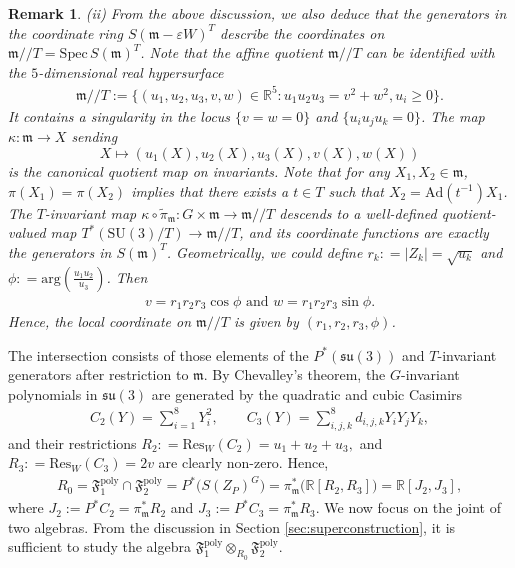 \documentclass[11pt]{amsart}
\theoremstyle{definition}
\theoremstyle{plain}
\newtheorem{remark}[theorem]{Remark}
\theoremstyle{conclusion}
\begin{document}
\begin{remark}
  (ii)   From the above discussion, we also deduce that the generators in the coordinate ring $S(\mathfrak{m}-\varepsilon W)^T$ describe the coordinates on $ \mathfrak{m}//T= \mathrm{Spec}\,S(\mathfrak{m})^T$. Note that the affine quotient $\mathfrak{m}//T$ can be identified with the $5$-dimensional real hypersurface \begin{align}
    \mathfrak{m}//T:= \{(u_1,u_2,u_3,v,w)\in\mathbb{R}^{5}: u_1u_2u_3 = v^2 + w^2,  u_i \geq 0 \}. \label{eq:afb}
\end{align} It contains a singularity in the locus $\{v = w  = 0\}$ and $\{u_iu_ju_k = 0\}$.   The map $\kappa:\mathfrak{m}\to X$ sending $$X\mapsto(u_1(X),u_2(X),u_3(X),v(X),w(X))$$ is the canonical quotient map on invariants. Note that for any $X_1,X_2 \in \mathfrak{m}$, $\pi(X_1) = \pi(X_2)$ implies that there exists a $t \in T$ such that $X_2 = \mathrm{Ad}(t^{-1})X_1$. The $T$-invariant map $\kappa\circ\widetilde{\pi}_{\mathfrak{m}}:G\times\mathfrak{m}\to\mathfrak{m}//T$ descends to a well-defined quotient-valued map $T^*(\mathrm{SU}(3)/T)\to\mathfrak{m}//T$, and its coordinate functions are exactly the generators in $S(\mathfrak{m})^T$. Geometrically, we could define $r_k : = |Z_k| = \sqrt{u_k}$ and $\phi : = \mathrm{arg} \left(\frac{u_1 u_2}{u_3}\right)$. Then \begin{align*}
    v = r_1 r_2 r_3 \cos \phi \text{ and } w   = r_1 r_2 r_3 \sin \phi.
\end{align*} Hence, the local coordinate on $\mathfrak{m}//T$ is given by $(r_1,r_2,r_3,\phi)$.
\end{remark}


 

The intersection consists of those elements of the $P^*(\mathfrak{su}(3))$ and $T$-invariant generators after restriction to $\mathfrak{m}$. By Chevalley’s theorem, the $G$-invariant polynomials in $\mathfrak{su}(3)$ are generated by the quadratic and cubic Casimirs  \begin{align}
    C_2(Y)=\sum_{i=1}^8Y_i^2,\qquad  C_3(Y)=\sum_{i,j,k}^8d_{i,j,k}Y_iY_jY_k, \label{eq:Casimir}
\end{align}   and their restrictions $ R_2 : = \mathrm{Res}_W (C_2)  =u_1+u_2+u_3,$ and $ R_3 : = \mathrm{Res}_W (C_3)=2v $ are clearly non-zero.  Hence, \begin{align*}
R_0 = \mathfrak{F}_1^{\mathrm{poly}}\cap \mathfrak{F}_2^{\mathrm{poly}} =P^* \bigl(S(Z_P)^G\bigr) =\pi_\mathfrak{m}^* \bigl(\mathbb{R}[R_2,R_3]\bigr) =\mathbb{R}[J_2,J_3],    
\end{align*}  where $J_2:=P^*C_2=\pi_\mathfrak{m}^*R_2$ and $J_3:=P^*C_3=\pi_\mathfrak{m}^*R_3$. We now focus on the joint of two algebras. From the discussion in Section \ref{sec:superconstruction}, it is sufficient to study the algebra $\mathfrak{F}_1^{\mathrm{poly}} \otimes_{R_0} \mathfrak{F}_2^{\mathrm{poly}}$. 
\end{document}
